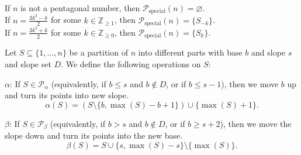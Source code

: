 \begin{lemma}\label{lemma: special} \leanok If $n$ is not a pentagonal number, then $ \mathcal{P}_{\mathrm{special}}(n)=\varnothing$.\\
If $n=\frac{3k^2-k}{2}$ for some $k\in\mathbb{Z}_{\geq 1}$, then $ \mathcal{P}_{\mathrm{special}}(n)=\{S_{-k}\} $.\\
If $n=\frac{3k^2+k}{2}$ for some $k\in\mathbb{Z}_{\geq 0}$, then $ \mathcal{P}_{\mathrm{special}}(n)=\{S_{k}\}$.
\end{lemma}

\begin{definition} \leanok
Let $S \subseteq \{1, \ldots, n\}$ be a partition of $n$ into different parts with base $b$ and slope $s$ and slope set $D$. We define the following operations on $S$:

$\alpha$: If $S\in \mathcal{P_\alpha}$  (equivalently, if $b \leq s$ and $b \notin D$, or if $b \leq s - 1$), then we move $b$ up and turn its points into new slope.
\begin{equation*}
    \alpha(S) = (S \setminus \{b, \max(S) - b + 1\}) \cup \{\max(S)+1\}.
\end{equation*}

$\beta$: If  $S\in \mathcal{P_\beta}$ (equivalently, if $b > s$ and $b \notin D$, or if $b \geq s + 2$), then we move the slope down and turn its points into the new base.
\begin{equation*}
    \beta(S) = S \cup \{s, \max(S)-s\} \setminus \{\max(S)\}.
\end{equation*}
\end{definition}

